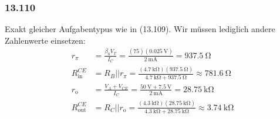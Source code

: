 \documentclass[11pt,a4paper,titlepage]{article}
\begin{document}
\subsubsection*{13.110}
Exakt gleicher Aufgabentypus wie in (13.109). Wir müssen lediglich andere Zahlenwerte einsetzen:
\begin{equation}
\begin{aligned}
r_{\pi} &= \frac{\beta_0V_T}{I_C} = \frac{(75)(\SI{0.025}{\volt})}{\SI{2}{\milli\ampere}} = \SI{937.5}{\ohm} \\
R_{\text{in}}^{CE} &= R_B || r_{\pi} =  \frac{(\SI{4.7}{\kilo\ohm})(\SI{937.5}{\ohm})}{\SI{4.7}{\kilo\ohm}+\SI{937.5}{\ohm}} \approx \SI{781.6}{\ohm} \\
r_{\text{o}} &= \frac{V_A+V_{CE}}{I_C} = \frac{\SI{50}{\volt} + \SI{7.5}{\volt}}{\SI{2}{\milli\ampere}} = \SI{28.75}{\kilo\ohm} \\
R_{\text{out}}^{CE} &= R_C || r_{\text{o}} = \frac{(\SI{4.3}{\kilo\ohm})(\SI{28.75}{\kilo\ohm})}{\SI{4.3}{\kilo\ohm} + \SI{28.75}{\kilo\ohm}} \approx \SI{3.74}{\kilo\ohm}
\end{aligned}
\end{equation}
\end{document}
